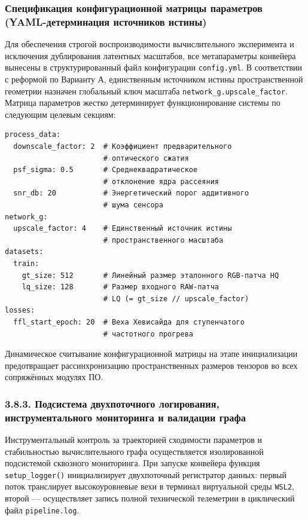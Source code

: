 \documentclass[12pt,a4paper]{article}
\begin{document}
\subsubsection[Конфигурационная матрица параметров (YAML)]{Спецификация конфигурационной матрицы параметров (YAML-детерминация источников истины)}
\label{sssec:yaml_matrix}

Для обеспечения строгой воспроизводимости вычислительного эксперимента и исключения дублирования латентных масштабов, все метапараметры конвейера вынесены в структурированный файл конфигурации \texttt{config.yml}. В соответствии с реформой по Варианту А, единственным источником истины пространственной геометрии назначен глобальный ключ масштаба \texttt{network\_g.upscale\_factor}. Матрица параметров жестко детерминирует функционирование системы по следующим целевым секциям:
\begin{verbatim}
process_data:
  downscale_factor: 2  # Коэффициент предварительного 
                       # оптического сжатия
  psf_sigma: 0.5       # Среднеквадратическое
                       # отклонение ядра рассеяния
  snr_db: 20           # Энергетический порог аддитивного
                       # шума сенсора
network_g:
  upscale_factor: 4    # Единственный источник истины 
                       # пространственного масштаба
datasets:
  train:
    gt_size: 512       # Линейный размер эталонного RGB-патча HQ
    lq_size: 128       # Размер входного RAW-патча 
                       # LQ (= gt_size // upscale_factor)
losses:
  ffl_start_epoch: 20  # Веха Хевисайда для ступенчатого
                       # частотного прогрева
\end{verbatim}
Динамическое считывание конфигурационной матрицы на этапе инициализации предотвращает рассинхронизацию пространственных размеров тензоров во всех сопряжённых модулях ПО.

\subsubsection{3.8.3. Подсистема двухпоточного логирования, инструментального мониторинга и валидации графа}

Инструментальный контроль за траекторией сходимости параметров и стабильностью вычислительного графа осуществляется изолированной подсистемой сквозного мониторинга. При запуске конвейера функция \texttt{setup\_logger()} инициализирует двухпоточный регистратор данных: первый поток транслирует высокоуровневые вехи в терминал виртуальной среды \texttt{WSL2}, второй --- осуществляет запись полной технической телеметрии в циклический файл \texttt{pipeline.log}.
\end{document}
